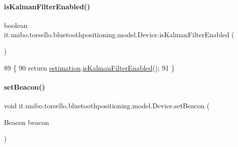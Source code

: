 \paragraph{\texorpdfstring{is\+Kalman\+Filter\+Enabled()}{isKalmanFilterEnabled()}}
{\footnotesize\ttfamily boolean it.\+unibo.\+torsello.\+bluetoothpositioning.\+model.\+Device.\+is\+Kalman\+Filter\+Enabled (\begin{DoxyParamCaption}{ }\end{DoxyParamCaption})}


\begin{DoxyCode}
89                                           \{
90         \textcolor{keywordflow}{return} \hyperlink{classit_1_1unibo_1_1torsello_1_1bluetoothpositioning_1_1model_1_1Device_ac619c42728cd40f41a5f12fde56b4425_ac619c42728cd40f41a5f12fde56b4425}{estimation}.\hyperlink{classit_1_1unibo_1_1torsello_1_1bluetoothpositioning_1_1distanceEstimation_1_1Estimation_a0863741935c878f7fa6f8c7c6cc086c9_a0863741935c878f7fa6f8c7c6cc086c9}{isKalmanFilterEnabled}();
91     \}
\end{DoxyCode}
\hypertarget{classit_1_1unibo_1_1torsello_1_1bluetoothpositioning_1_1model_1_1Device_a7aff672e35f15a271dd93bd59e413f28_a7aff672e35f15a271dd93bd59e413f28}{}\label{classit_1_1unibo_1_1torsello_1_1bluetoothpositioning_1_1model_1_1Device_a7aff672e35f15a271dd93bd59e413f28_a7aff672e35f15a271dd93bd59e413f28} 
\paragraph{\texorpdfstring{set\+Beacon()}{setBeacon()}}
{\footnotesize\ttfamily void it.\+unibo.\+torsello.\+bluetoothpositioning.\+model.\+Device.\+set\+Beacon (\begin{DoxyParamCaption}\item[{Beacon}]{beacon }\end{DoxyParamCaption})}


